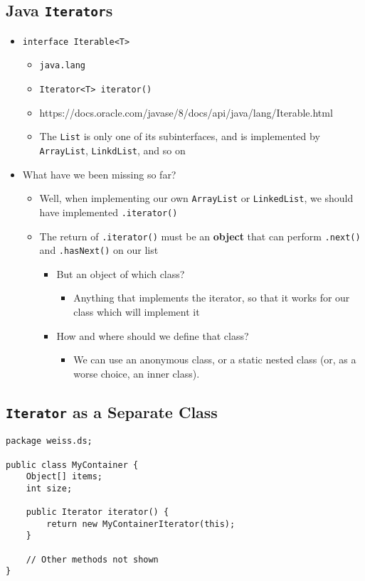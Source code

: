 \documentclass[10pt]{article}
\begin{document}
\subsection*{Java \texttt{Iterator}s}
\begin{itemize}
    \item \texttt{interface Iterable<T>}
    \begin{itemize}
        \item \texttt{java.lang}
        \item \texttt{Iterator<T> iterator()}
        \item https://docs.oracle.com/javase/8/docs/api/java/lang/Iterable.html
        \item The \texttt{List} is only one of its subinterfaces, and is implemented by \texttt{ArrayList}, \texttt{LinkdList}, and so on
    \end{itemize}
    \item What have we been missing so far?
    \begin{itemize}
        \item Well, when implementing our own \texttt{ArrayList} or \texttt{LinkedList}, we should have implemented \texttt{.iterator()}
        \item The return of \texttt{.iterator()} must be an \textbf{object} that can perform \texttt{.next()} and \texttt{.hasNext()} on our list
        \begin{itemize}
            \item But an object of which class?
            \begin{itemize}
                \item Anything that implements the iterator, so that it works for our class which will implement it
            \end{itemize}
            \item How and where should we define that class?
            \begin{itemize}
                \item We can use an anonymous class, or a static nested class (or, as a worse choice, an inner class).
            \end{itemize}
        \end{itemize}
    \end{itemize}
\end{itemize}

\subsection*{\texttt{Iterator} as a Separate Class}
\begin{verbatim}
package weiss.ds;

public class MyContainer {
    Object[] items;
    int size;
    
    public Iterator iterator() {
        return new MyContainerIterator(this);
    }
    
    // Other methods not shown
}
\end{verbatim}
\end{document}
